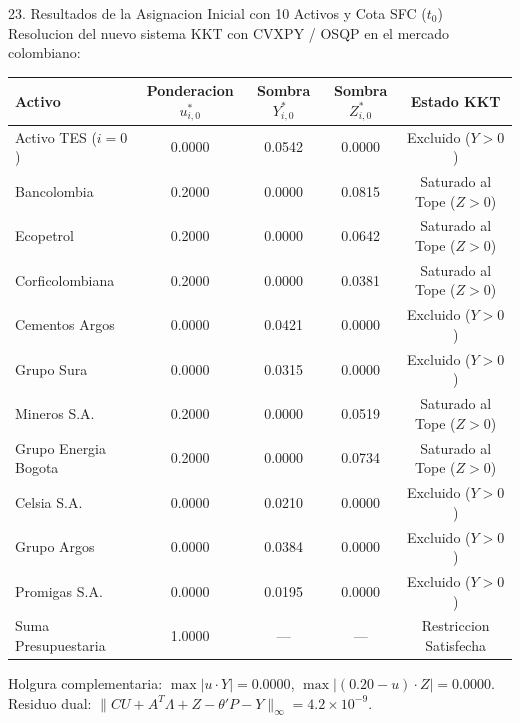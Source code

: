 \documentclass[aspectratio=169,10pt]{beamer}
\begin{document}
\begin{frame}{23. Resultados de la Asignacion Inicial con 10 Activos y Cota SFC ($t_0$)}
  Resolucion del nuevo sistema KKT con CVXPY / OSQP en el mercado colombiano:
  \vspace{0.1cm}
  \begin{table}[h]
    \centering
    \scriptsize
    \setlength{\tabcolsep}{6pt}
    \begin{tabular}{lcccc}
      \toprule
      Activo & Ponderacion $u_{i,0}^*$ & Sombra $Y_{i,0}^*$ & Sombra $Z_{i,0}^*$ & Estado KKT \\
      \midrule
      Activo TES ($i=0$) & 0.0000 & 0.0542 & 0.0000 & Excluido ($Y > 0$) \\
      Bancolombia & 0.2000 & 0.0000 & 0.0815 & Saturado al Tope ($Z > 0$) \\
      Ecopetrol & 0.2000 & 0.0000 & 0.0642 & Saturado al Tope ($Z > 0$) \\
      Corficolombiana & 0.2000 & 0.0000 & 0.0381 & Saturado al Tope ($Z > 0$) \\
      Cementos Argos & 0.0000 & 0.0421 & 0.0000 & Excluido ($Y > 0$) \\
      Grupo Sura & 0.0000 & 0.0315 & 0.0000 & Excluido ($Y > 0$) \\
      Mineros S.A. & 0.2000 & 0.0000 & 0.0519 & Saturado al Tope ($Z > 0$) \\
      Grupo Energia Bogota & 0.2000 & 0.0000 & 0.0734 & Saturado al Tope ($Z > 0$) \\
      Celsia S.A. & 0.0000 & 0.0210 & 0.0000 & Excluido ($Y > 0$) \\
      Grupo Argos & 0.0000 & 0.0384 & 0.0000 & Excluido ($Y > 0$) \\
      Promigas S.A. & 0.0000 & 0.0195 & 0.0000 & Excluido ($Y > 0$) \\
      \midrule
      Suma Presupuestaria & 1.0000 & --- & --- & Restriccion Satisfecha \\
      \bottomrule
    \end{tabular}
  \end{table}
  \vspace{0.1cm}
  \centering\tiny Holgura complementaria: $\max |u \cdot Y| = 0.0000$, $\max |(0.20 - u) \cdot Z| = 0.0000$. Residuo dual: $\|C U + A^T \Lambda + Z - \theta' P - Y\|_\infty = 4.2 \times 10^{-9}$.
\end{frame}
\end{document}
